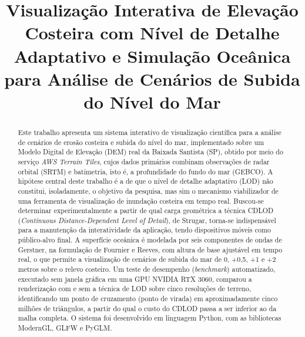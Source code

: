 \documentclass[conference]{IEEEtran}
\begin{document}
\title{Visualização Interativa de Elevação Costeira com Nível de Detalhe
Adaptativo e Simulação Oceânica para Análise de Cenários de Subida do
Nível do Mar}

\author{
}

\maketitle

\begin{abstract}
Este trabalho apresenta um sistema interativo de visualização científica
para a análise de cenários de erosão costeira e subida do nível do mar,
implementado sobre um Modelo Digital de Elevação (DEM) real da Baixada
Santista (SP), obtido por meio do serviço \emph{AWS Terrain Tiles}, cujos
dados primários combinam observações de radar orbital (SRTM) e batimetria,
isto é, a profundidade do fundo do mar (GEBCO). A hipótese central deste trabalho é a de que o nível de detalhe
adaptativo (LOD) não constitui, isoladamente, o objetivo da pesquisa, mas
sim o mecanismo viabilizador de uma ferramenta de visualização de
inundação costeira em tempo real. Buscou-se determinar experimentalmente
a partir de qual carga geométrica a técnica CDLOD (\emph{Continuous
Distance-Dependent Level of Detail}), de Strugar, torna-se indispensável
para a manutenção da interatividade da aplicação, tendo dispositivos
móveis como público-alvo final. A superfície oceânica é modelada por seis
componentes de ondas de Gerstner, na formulação de Fournier e Reeves, com
altura de base ajustável em tempo real, o que permite a visualização de
cenários de subida do mar de 0, +0,5, +1 e +2 metros sobre o relevo
costeiro. Um teste de desempenho (\emph{benchmark}) automatizado, executado sem
janela gráfica em uma GPU NVIDIA RTX 3060, comparou a renderização com e sem a técnica de LOD
sobre cinco resoluções de terreno, identificando um ponto de cruzamento
(ponto de virada) em aproximadamente cinco milhões de triângulos, a
partir do qual o custo do CDLOD passa a ser inferior ao da malha completa.
O sistema foi desenvolvido em linguagem Python, com as bibliotecas
ModernGL, GLFW e PyGLM.
\end{abstract}
\end{document}
